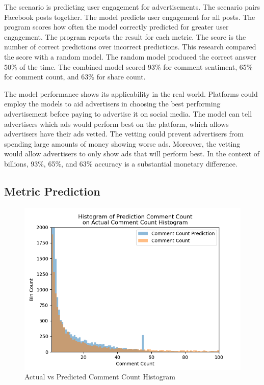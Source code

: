 \documentclass{article}
\begin{document}
The scenario is predicting user engagement for advertisements. The scenario pairs Facebook posts together. The model predicts user engagement for all posts. The program scores how often the model correctly predicted for greater user engagement. The program reports the result for each metric. The score is the number of correct predictions over incorrect predictions. This research compared the score with a random model. The random model produced the correct answer 50\% of the time. The combined model scored 93\% for comment sentiment, 65\% for comment count, and 63\% for share count.

The model performance shows its applicability in the real world.  Platforms could employ the models to aid advertisers in choosing the best performing advertisement before paying to advertise it on social media. The model can tell advertisers which ads would perform best on the platform, which allows advertisers have their ads vetted. The vetting could prevent advertisers from spending large amounts of money showing worse ads. Moreover, the vetting would allow advertisers to only show ads that will perform best. In the context of billions, 93\%, 65\%, and 63\% accuracy is a substantial monetary difference.

\subsection{Metric Prediction}

\begin{figure}
\centering
\includegraphics[width=\columnwidth]{images/Comment_Count_Prediction_vs_Actual.png}
\caption{Actual vs Predicted Comment Count Histogram}
\label{comment_count_histogram}
\end{figure}
\end{document}
